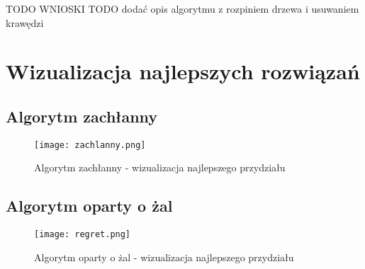\documentclass{mwart}
\begin{document}
TODO WNIOSKI
TODO dodać opis algorytmu z rozpiniem drzewa i usuwaniem krawędzi

\section{Wizualizacja najlepszych rozwiązań}
\subsection{Algorytm zachłanny}
\begin{figure}[H]
    \centering
    \texttt{[image: zachlanny.png]}
    \caption{Algorytm zachłanny - wizualizacja najlepszego przydziału}
\end{figure}

\subsection{Algorytm oparty o żal}
\begin{figure}[H]
    \centering
    \texttt{[image: regret.png]}
    \caption{Algorytm oparty o żal - wizualizacja najlepszego przydziału}
\end{figure}
\end{document}
